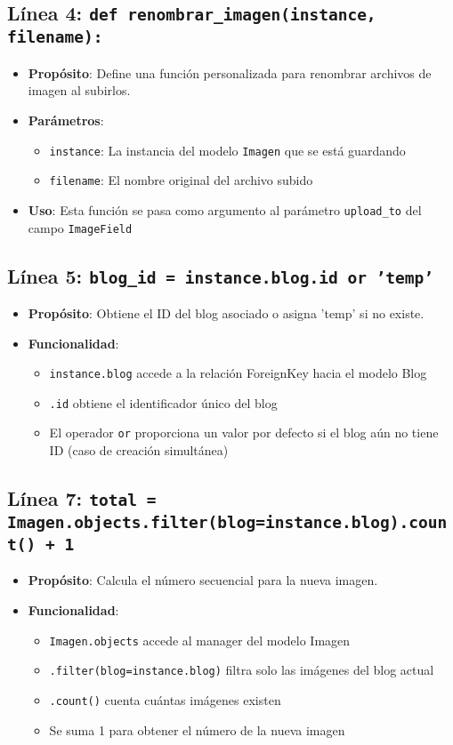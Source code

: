 \documentclass[12pt,a4paper]{article}
\begin{document}
	\subsection{Línea 4: \texttt{def renombrar\_imagen(instance, filename):}}
	\begin{itemize}
		\item \textbf{Propósito}: Define una función personalizada para renombrar archivos de imagen al subirlos.
		\item \textbf{Parámetros}:
		\begin{itemize}
			\item \texttt{instance}: La instancia del modelo \texttt{Imagen} que se está guardando
			\item \texttt{filename}: El nombre original del archivo subido
		\end{itemize}
		\item \textbf{Uso}: Esta función se pasa como argumento al parámetro \texttt{upload\_to} del campo \texttt{ImageField}
	\end{itemize}
	
	\subsection{Línea 5: \texttt{blog\_id = instance.blog.id or 'temp'}}
	\begin{itemize}
		\item \textbf{Propósito}: Obtiene el ID del blog asociado o asigna 'temp' si no existe.
		\item \textbf{Funcionalidad}:
		\begin{itemize}
			\item \texttt{instance.blog} accede a la relación ForeignKey hacia el modelo Blog
			\item \texttt{.id} obtiene el identificador único del blog
			\item El operador \texttt{or} proporciona un valor por defecto si el blog aún no tiene ID (caso de creación simultánea)
		\end{itemize}
	\end{itemize}
	
	\subsection{Línea 7: \texttt{total = Imagen.objects.filter(blog=instance.blog).count() + 1}}
	\begin{itemize}
		\item \textbf{Propósito}: Calcula el número secuencial para la nueva imagen.
		\item \textbf{Funcionalidad}:
		\begin{itemize}
			\item \texttt{Imagen.objects} accede al manager del modelo Imagen
			\item \texttt{.filter(blog=instance.blog)} filtra solo las imágenes del blog actual
			\item \texttt{.count()} cuenta cuántas imágenes existen
			\item Se suma 1 para obtener el número de la nueva imagen
		\end{itemize}
	\end{itemize}
	
\end{document}
